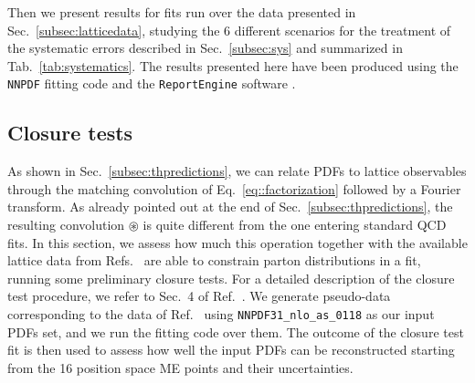 Then we present results for fits run over the data presented in
Sec.~\ref{subsec:latticedata}, studying the 6 different scenarios for the
treatment of the systematic errors described in Sec.~\ref{subsec:sys} and
summarized in Tab.~\ref{tab:systematics}. 
The results presented here have been produced using the {\tt NNPDF} fitting code \cite{Ball:2017nwa}
and the {\tt ReportEngine} software \cite{zahari_kassabov_2019_2571601}.  

\subsection{Closure tests}
\label{subsec:CT}
As shown in Sec.~\ref{subsec:thpredictions}, we can relate PDFs to lattice
observables through the matching convolution of Eq.~\eqref{eq::factorization}
followed by a Fourier transform. As already pointed out at the end of
Sec.~\ref{subsec:thpredictions}, the resulting convolution $\circledast$ is
quite different from the one entering standard QCD fits. In this section, we
assess how much this operation together with the available lattice data from
Refs.~\cite{Alexandrou:2018pbm,Alexandrou:2019lfo} are able to constrain parton distributions in a
fit, running some preliminary closure tests. For a detailed description of the
closure test procedure, we refer to Sec.~4 of Ref.~\cite{Ball:2014uwa}. We
generate pseudo-data corresponding to the data of Ref.~\cite{Alexandrou:2018pbm}
using {\tt NNPDF31\_nlo\_as\_0118} as our input PDFs set, and we run the fitting
code over them. The outcome of the closure test fit is then used to assess how
well the input PDFs can be reconstructed starting from the 16 position space ME
points and their uncertainties.

